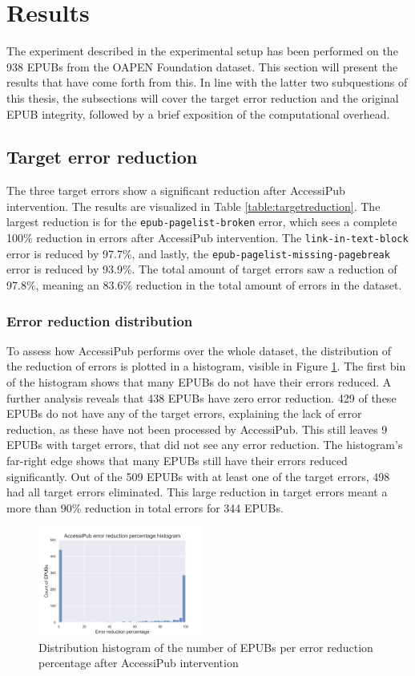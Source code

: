 \section{Results}
\label{sec:results}
The experiment described in the experimental setup has been performed on the 938 EPUBs from the OAPEN Foundation dataset. This section will present the results that have come forth from this. In line with the latter two subquestions of this thesis, the subsections will cover the target error reduction and the original EPUB integrity, followed by a brief exposition of the computational overhead.

\subsection{Target error reduction}
The three target errors show a significant reduction after AccessiPub intervention. The results are visualized in Table \ref{table:targetreduction}. The largest reduction is for the \texttt{epub-pagelist-broken} error, which sees a complete 100\% reduction in errors after AccessiPub intervention. The \texttt{link-in-text-block} error is reduced by 97.7\%, and lastly, the \texttt{epub-pagelist-missing-pagebreak} error is reduced by 93.9\%. The total amount of target errors saw a reduction of 97.8\%, meaning an 83.6\% reduction in the total amount of errors in the dataset.


\subsubsection{Error reduction distribution}
To assess how AccessiPub performs over the whole dataset, the distribution of the reduction of errors is plotted in a histogram, visible in Figure \ref{figure:reduction}. The first bin of the histogram shows that many EPUBs do not have their errors reduced. A further analysis reveals that 438 EPUBs have zero error reduction. 429 of these EPUBs do not have any of the target errors, explaining the lack of error reduction, as these have not been processed by AccessiPub. This still leaves 9 EPUBs with target errors, that did not see any error reduction.
The histogram's far-right edge shows that many EPUBs still have their errors reduced significantly. Out of the 509 EPUBs with at least one of the target errors, 498 had all target errors eliminated. This large reduction in target errors meant a more than 90\% reduction in total errors for 344 EPUBs.

\begin{figure}[h]
\includegraphics[width=0.48\textwidth,keepaspectratio]{media/images/fancy_reduction.png}
\caption{Distribution histogram of the number of EPUBs per error reduction percentage after AccessiPub intervention}
\centering
\label{figure:reduction}
\end{figure}

